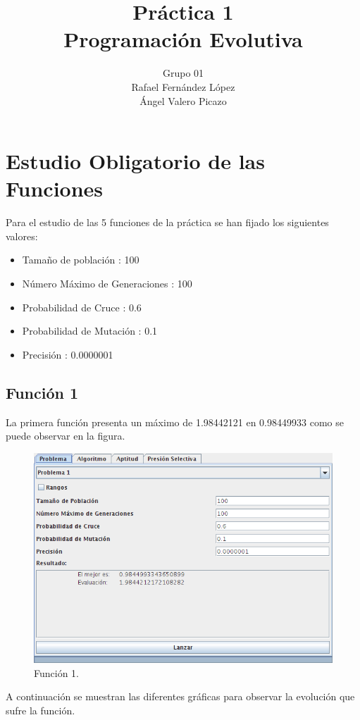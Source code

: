 \documentclass[12pt]{article}
\title{Práctica 1\\Programación Evolutiva}
\author{Grupo 01\\Rafael Fernández López\\Ángel Valero Picazo}
\date{}
\begin{document}
\maketitle
\newpage
\newpage
\tableofcontents
\newpage

\section{Estudio Obligatorio de las Funciones}	
	Para el estudio de las 5 funciones de la práctica se han fijado los siguientes valores:
	\begin{itemize}
		\item Tamaño de población : 100
		\item Número Máximo de Generaciones : 100
		\item Probabilidad de Cruce : 0.6
		\item Probabilidad de Mutación : 0.1
		\item Precisión : 0.0000001
	\end{itemize}

\subsection{Función 1}
	La primera función presenta un máximo de 1.98442121 en 0.98449933 como se puede observar en la figura.
\begin{figure}[H]
\centering
\includegraphics[scale=0.4]{graficas/F1inicial}
\caption{Función 1.}
\label{fig}
\end{figure}
	A continuación se muestran las diferentes gráficas para observar la evolución que sufre la función.
\end{document}
